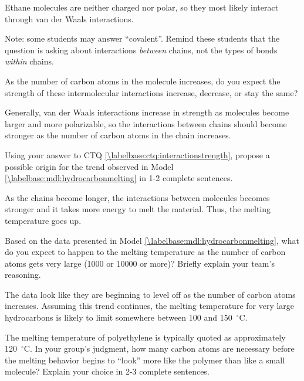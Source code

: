 \begin{activity}
\begin{ctqs}
		\begin{solution}[0.5in]
			Ethane molecules are neither charged nor polar, so they most likely interact through van der Waals interactions.
			
			Note: some students may answer ``covalent''.  Remind these students that the question is asking about interactions \emph{between} chains, not the types of bonds \emph{within} chains.
		\end{solution}
	
	\question As the number of carbon atoms in the molecule increases, do you expect the strength of these intermolecular interactions increase, decrease, or stay the same? \label{\labelbase:ctq:interactionstrength}
	
		\begin{solution}[0.5in]
			Generally, van der Waals interactions increase in strength as molecules become larger and more polarizable, so the interactions between chains should become stronger as the number of carbon atoms in the chain increases.
		\end{solution}
	
	\question Using your answer to CTQ \ref{\labelbase:ctq:interactionstrength}, propose a possible origin for the trend observed in Model \ref{\labelbase:mdl:hydrocarbonmelting} in 1-2 complete sentences.
	
		\begin{solution}[2in]
			As the chains become longer, the interactions between molecules becomes stronger and it takes more energy to melt the material.  Thus, the melting temperature goes up.
		\end{solution}
	
	\question Based on the data presented in Model \ref{\labelbase:mdl:hydrocarbonmelting}, what do you expect to happen to the melting temperature as the number of carbon atoms gets very large (1000 or 10000 or more)?  Briefly explain your team's reasoning.
	
		\begin{solution}[2in]
		
			The data look like they are beginning to level off as the number of carbon atoms increases.  Assuming this trend continues, the melting temperature for very large hydrocarbons is likely to limit somewhere between 100 and 150~${}^\circ$C. 
		\end{solution}
	
	\question The melting temperature of polyethylene is typically quoted as approximately 120~${}^\circ$C.  In your group's judgment, how many carbon atoms are necessary before the melting behavior begins to ``look'' more like the polymer than like a small molecule?  Explain your choice in 2-3 complete sentences. \label{\labelbase:ctq:npolymer}
	

\end{ctqs}
\end{activity}
